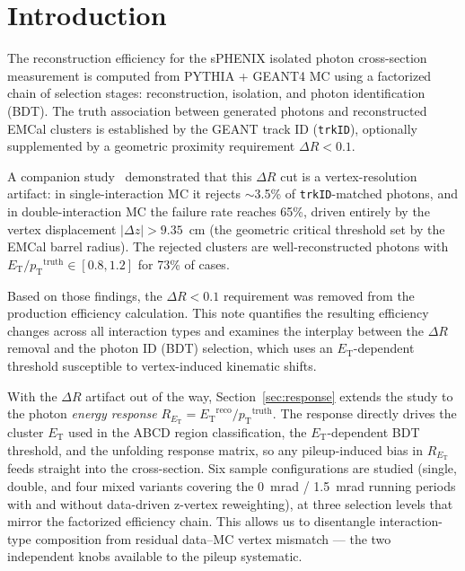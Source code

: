 \documentclass[11pt,letterpaper]{article}
\newcommand{\DR}{\ensuremath{\Delta R}}
\newcommand{\pT}{\ensuremath{p_{\text{T}}}}
\newcommand{\ET}{\ensuremath{E_{\text{T}}}}
\begin{document}
\tableofcontents
\newpage


\section{Introduction}
\label{sec:intro}

The reconstruction efficiency for the sPHENIX isolated photon cross-section
measurement is computed from PYTHIA + GEANT4 MC using a factorized chain of
selection stages: reconstruction, isolation, and photon identification (BDT).
The truth association between generated photons and reconstructed EMCal clusters
is established by the GEANT track ID (\texttt{trkID}), optionally supplemented
by a geometric proximity requirement $\DR < 0.1$.

A companion study~\cite{dr_study} demonstrated that this $\DR$ cut is a
vertex-resolution artifact: in single-interaction MC it rejects $\sim$3.5\%
of \texttt{trkID}-matched photons, and in double-interaction MC the failure
rate reaches 65\%, driven entirely by the vertex displacement
$|\Delta z| > 9.35$~cm (the geometric critical threshold set by the EMCal
barrel radius). The rejected clusters are well-reconstructed photons with
$\ET / \pT^{\text{truth}} \in [0.8, 1.2]$ for 73\% of cases.

Based on those findings, the $\DR < 0.1$ requirement was removed from the
production efficiency calculation. This note quantifies the resulting
efficiency changes across all interaction types and examines the interplay
between the $\DR$ removal and the photon ID (BDT) selection, which uses an
\ET-dependent threshold susceptible to vertex-induced kinematic shifts.

With the $\DR$ artifact out of the way, Section~\ref{sec:response}
extends the study to the photon \emph{energy response}
$R_{\ET} = \ET^{\text{reco}} / \pT^{\text{truth}}$. The response directly
drives the cluster \ET{} used in the ABCD region classification, the
\ET-dependent BDT threshold, and the unfolding response matrix, so any
pileup-induced bias in $R_{\ET}$ feeds straight into the cross-section.
Six sample configurations are studied (single, double, and four mixed
variants covering the 0~mrad / 1.5~mrad running periods with and without
data-driven z-vertex reweighting), at three selection levels that mirror
the factorized efficiency chain. This allows us to disentangle
interaction-type composition from residual data--MC vertex mismatch —
the two independent knobs available to the pileup systematic.
\end{document}

